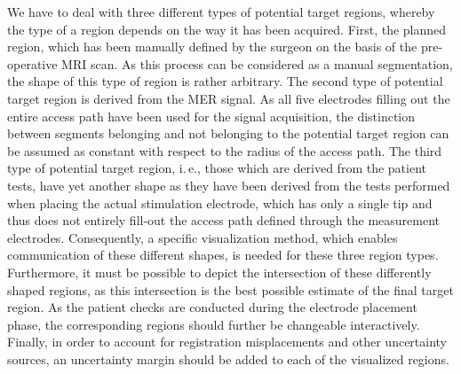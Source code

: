 \documentclass{vgtc}                          %
\begin{document}
We have to deal with three different types of potential target regions, whereby the type of a region depends on the way it has been acquired. First, the planned region, which has been manually defined by the surgeon on the basis of the pre-operative MRI scan. As this process can be considered as a manual segmentation, the shape of this type of region is rather arbitrary. The second type of potential target region is derived from the MER signal. As all five electrodes filling out the entire access path have been used for the signal acquisition, the distinction between segments belonging and not belonging to the potential target region can be assumed as constant with respect to the radius of the access path. The third type of potential target region, i.\,e., those which are derived from the patient tests, have yet another shape as they have been derived from the tests performed when placing the actual stimulation electrode, which has only a single tip and thus does not entirely fill-out the access path defined through the measurement electrodes. Consequently, a specific visualization method, which enables communication of these different shapes, is needed for these three region types. Furthermore, it must be possible to depict the intersection of these differently shaped regions, as this intersection is the best possible estimate of the final target region. As the patient checks are conducted during the electrode placement phase, the corresponding regions should further be changeable interactively. Finally, in order to account for registration misplacements and other uncertainty sources, an uncertainty margin should be added to each of the visualized regions.
\end{document}
